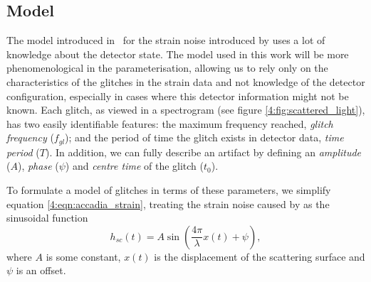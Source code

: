 \subsection{Model}

The model introduced in~\cite{TAccadia:2010} for the \gwadj strain noise introduced by \scl uses a lot of knowledge about the detector state. The model used in this work will be more phenomenological in the parameterisation, allowing us to rely only on the characteristics of the glitches in the strain data and not knowledge of the detector configuration, especially in cases where this detector information might not be known. Each \scladj glitch, as viewed in a spectrogram (see figure \ref{4:fig:scattered_light}), has two easily identifiable features: the maximum frequency reached, \emph{glitch frequency} ($f_{gl}$); and the period of time the glitch exists in detector data, \emph{time period} ($T$).  In addition, we can fully describe an artifact by defining an \emph{amplitude} ($A$), \emph{phase} ($\psi$) and \emph{centre time} of the glitch ($t_0$).

To formulate a model of \scladj glitches in terms of these parameters, we simplify equation \ref{4:eqn:accadia_strain}, treating the strain noise caused by \scl as the sinusoidal function
%
\begin{equation}
  h_{sc}(t) = A \sin\left(\frac{4\pi}{\lambda}x(t) + \psi\right),
  \label{4:eqn:h_sc_initial}
\end{equation}
%
where $A$ is some constant, $x(t)$ is the displacement of the scattering surface and $\psi$ is an offset.

